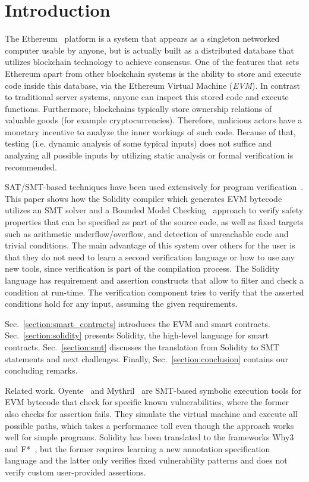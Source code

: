 \section{Introduction}
The Ethereum~\cite{YellowPaper} platform is a system that appears as a
singleton networked computer usable by anyone, but is actually built as a
distributed database that utilizes blockchain technology to achieve consensus.
%
One of the features that sets Ethereum apart from other blockchain systems is
the ability to store and execute code inside this database, via the Ethereum
Virtual Machine (\emph{EVM}).
%
In contrast to traditional server systems, anyone can inspect this stored code
and execute functions.
%
Furthermore, blockchains typically store ownership relations of valuable goods
(for example
cryptocurrencies).
%
Therefore, malicious actors have a monetary incentive to analyze the inner
workings of such code. Because of that, testing (i.e.  dynamic analysis of some
typical inputs) does not suffice and analyzing all possible inputs by utilizing
static analysis or formal verification is recommended.

SAT/SMT-based techniques have been used extensively for program 
verification~\cite{Biere99,Donaldson11,Komuravelli13,Beyer11,Kroening14,Alt17}.
%
This paper shows how the Solidity compiler which generates EVM bytecode
utilizes an SMT solver and a Bounded Model Checking~\cite{Biere99} approach to
verify safety properties that can be specified as part of the source code, as
well as fixed targets such as arithmetic underflow/overflow, and detection of
unreachable code and trivial conditions.
%
The main advantage of this system over others for the user is that they do not
need to learn a second verification language or how to use any new tools, since
verification is part of the compilation process.
%
The Solidity language has requirement and assertion constructs that allow to
filter and check a condition at run-time.  The verification component tries to
verify that the asserted conditions hold for any input, assuming the given
requirements.

Sec.~\ref{section:smart_contracts} introduces the EVM and smart contracts.
Sec.~\ref{section:solidity} presents Solidity, the high-level language for smart
contracts. Sec.~\ref{section:smt} discusses the translation from Solidity to SMT
statements and next challenges. Finally, Sec.~\ref{section:conclusion}
contains our concluding remarks.

\begin{paragraph}{Related work.}
Oyente~\cite{Luu2016} and Mythril~\cite{Mythril} are SMT-based symbolic
execution tools for EVM bytecode that check for specific known vulnerabilities,
where the former also checks for assertion fails. They simulate the virtual
machine and execute all possible paths, which takes a performance toll even
though the approach works well for simple programs.
%
Solidity has been translated to the frameworks Why3~\cite{Why3} and
F*~\cite{Bhargavan2016}, but the former requires learning a new annotation
specification language and the latter only verifies fixed vulnerability
patterns and does not verify custom user-provided assertions.

\end{paragraph}
